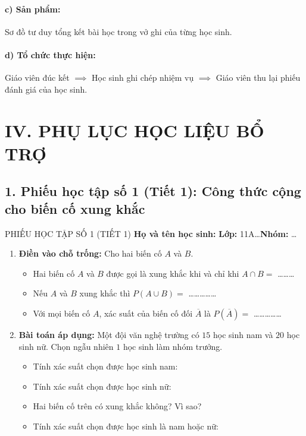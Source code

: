 \documentclass[12pt, a4paper]{article}
\begin{document}
\paragraph{c) Sản phẩm:} Sơ đồ tư duy tổng kết bài học trong vở ghi của từng học sinh.

\paragraph{d) Tổ chức thực hiện:} Giáo viên đúc kết $\implies$ Học sinh ghi chép nhiệm vụ $\implies$ Giáo viên thu lại phiếu đánh giá của học sinh.

\section*{IV. PHỤ LỤC HỌC LIỆU BỔ TRỢ}

\subsection*{1. Phiếu học tập số 1 (Tiết 1): Công thức cộng cho biến cố xung khắc}

\begin{pedabox}{PHIẾU HỌC TẬP SỐ 1 (TIẾT 1)}
\textbf{Họ và tên học sinh:} \dotfill \textbf{Lớp:} 11A\dots \quad \textbf{Nhóm:} \dots
\begin{enumerate}[leftmargin=0.6cm]
    \item \textbf{Điền vào chỗ trống:} Cho hai biến cố $A$ và $B$.
    \begin{itemize}
        \item Hai biến cố $A$ và $B$ được gọi là xung khắc khi và chỉ khi $A \cap B = $ \dots\dots\dots
        \item Nếu $A$ và $B$ xung khắc thì $P(A \cup B) = $ \dots\dots\dots\dots\dots
        \item Với mọi biến cố $A$, xác suất của biến cố đối $\overline{A}$ là $P(\overline{A}) = $ \dots\dots\dots\dots\dots
    \end{itemize}
    \item \textbf{Bài toán áp dụng:} Một đội văn nghệ trường có $15$ học sinh nam và $20$ học sinh nữ. Chọn ngẫu nhiên $1$ học sinh làm nhóm trưởng.
    \begin{itemize}
        \item Tính xác suất chọn được học sinh nam: \dotfill
        \item Tính xác suất chọn được học sinh nữ: \dotfill
        \item Hai biến cố trên có xung khắc không? Vì sao? \dotfill
        \item Tính xác suất chọn được học sinh là nam hoặc nữ: \dotfill
    \end{itemize}
\end{enumerate}
\end{pedabox}
\end{document}
